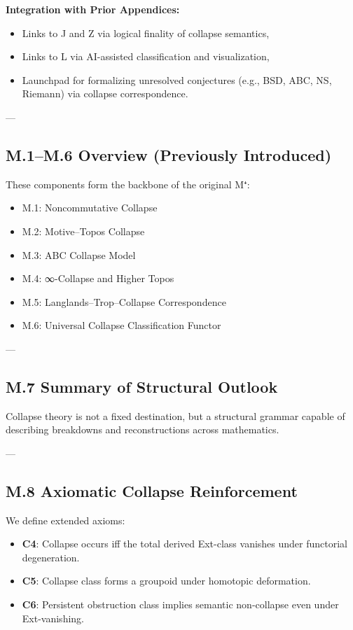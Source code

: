 \documentclass[11pt]{article}
\begin{document}
\begin{axiom}
\begin{axiom}
{{\textbf{Integration with Prior Appendices:}
\begin{itemize}
  \item Links to J and Z via logical finality of collapse semantics,
  \item Links to L via AI-assisted classification and visualization,
  \item Launchpad for formalizing unresolved conjectures (e.g., BSD, ABC, NS, Riemann) via collapse correspondence.
\end{itemize}

---

\subsection*{M.1–M.6 Overview (Previously Introduced)}

These components form the backbone of the original M⁺:

\begin{itemize}
  \item M.1: Noncommutative Collapse
  \item M.2: Motive–Topos Collapse
  \item M.3: ABC Collapse Model
  \item M.4: ∞-Collapse and Higher Topos
  \item M.5: Langlands–Trop–Collapse Correspondence
  \item M.6: Universal Collapse Classification Functor
\end{itemize}

---

\subsection*{M.7 Summary of Structural Outlook}

Collapse theory is not a fixed destination, but a structural grammar  
capable of describing breakdowns and reconstructions across mathematics.

---

\subsection*{M.8 Axiomatic Collapse Reinforcement}

We define extended axioms:

\begin{itemize}
  \item \textbf{C4}: Collapse occurs iff the total derived Ext-class vanishes under functorial degeneration.
  \item \textbf{C5}: Collapse class forms a groupoid under homotopic deformation.
  \item \textbf{C6}: Persistent obstruction class implies semantic non-collapse even under Ext-vanishing.
\end{itemize}

}}
\end{axiom}
\end{axiom}
\end{document}
